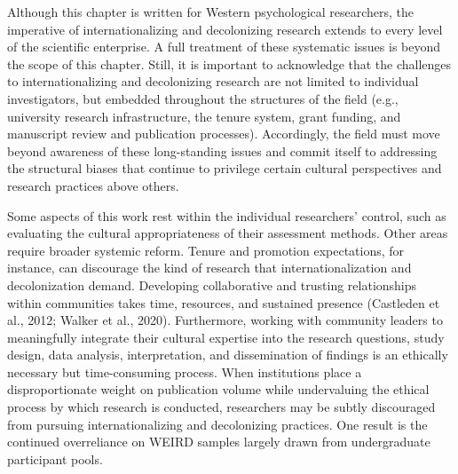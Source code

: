 \documentclass[
  11pt,
]{book}
\begin{document}
Although this chapter is written for Western psychological researchers, the imperative of internationalizing and decolonizing research extends to every level of the scientific enterprise. A full treatment of these systematic issues is beyond the scope of this chapter. Still, it is important to acknowledge that the challenges to internationalizing and decolonizing research are not limited to individual investigators, but embedded throughout the structures of the field (e.g., university research infrastructure, the tenure system, grant funding, and manuscript review and publication processes). Accordingly, the field must move beyond awareness of these long-standing issues and commit itself to addressing the structural biases that continue to privilege certain cultural perspectives and research practices above others.

Some aspects of this work rest within the individual researchers' control, such as evaluating the cultural appropriateness of their assessment methods. Other areas require broader systemic reform. Tenure and promotion expectations, for instance, can discourage the kind of research that internationalization and decolonization demand. Developing collaborative and trusting relationships within communities takes time, resources, and sustained presence (Castleden et al., 2012; Walker et al., 2020). Furthermore, working with community leaders to meaningfully integrate their cultural expertise into the research questions, study design, data analysis, interpretation, and dissemination of findings is an ethically necessary but time-consuming process. When institutions place a disproportionate weight on publication volume while undervaluing the ethical process by which research is conducted, researchers may be subtly discouraged from pursuing internationalizing and decolonizing practices. One result is the continued overreliance on WEIRD samples largely drawn from undergraduate participant pools.
\end{document}
